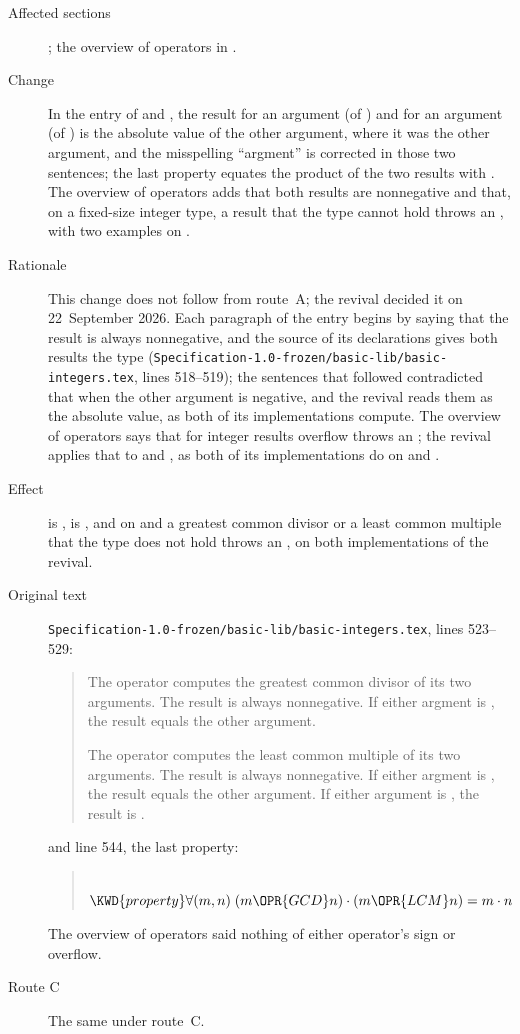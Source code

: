\begin{description}
\item[Affected sections] ; the overview of operators in
.
\item[Change] In the entry of  and , the result for an argument
 (of ) and for an argument  (of ) is the absolute
value of the other argument, where it was the other argument, and the misspelling
``argment'' is corrected in those two sentences; the last property equates the
product of the two results with .
The overview of operators adds that both results are nonnegative and that, on a
fixed-size integer type, a result that the type cannot hold throws an
, with two examples on .
\item[Rationale] This change does not follow from route~A; the revival decided it on
22~September 2026.
Each paragraph of the entry begins by saying that the result is always nonnegative,
and the source of its declarations gives both results the type 
(\nolinkurl{Specification-1.0-frozen/basic-lib/basic-integers.tex}, lines
518--519); the sentences that followed contradicted that when the other argument is
negative, and the revival reads them as the absolute value, as both of its
implementations compute.
The overview of operators says that for integer results overflow throws an
; the revival applies that to  and , as both
of its implementations do on  and .
\item[Effect]  is ,  is , and
on  and  a greatest common divisor or a least
common multiple that the type does not hold throws an , on both
implementations of the revival.
\item[Original text] \nolinkurl{Specification-1.0-frozen/basic-lib/basic-integers.tex},
lines 523--529:
\begin{quote}
The operator  computes the greatest common divisor of its two arguments.
The result is always nonnegative.  If either argment is , the result
equals the other argument.

The operator  computes the least common multiple of its two arguments.
The result is always nonnegative.  If either argment is , the result
equals the other argument.  If either argument is , the result is .
\end{quote}
and line 544, the last property:
\begin{quote}
\begin{Fortress}
{\tt~~}\(  \KWD{property} \forall (m, n)\; (m \OPR{GCD} n) \cdot (m \OPR{LCM} n) = m \cdot n\)
\end{Fortress}
\end{quote}
The overview of operators said nothing of either operator's sign or overflow.
\item[Route C] The same under route~C.
\end{description}

